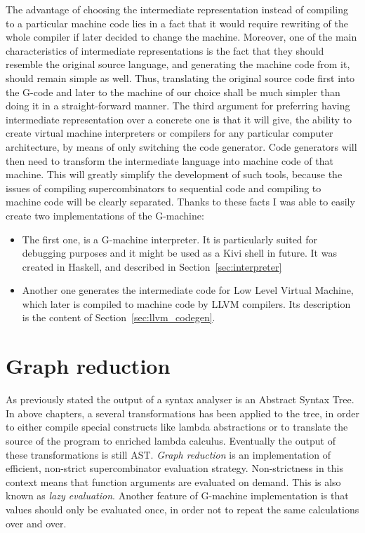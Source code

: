 \documentclass[12pt,a4paper]{report}
\begin{document}
The advantage of choosing the intermediate representation instead of compiling
to a particular machine code lies in a fact that it would require rewriting of
the whole compiler if later decided to change the machine. Moreover, one of the
main characteristics of intermediate representations is the fact that they
should resemble the original source language, and generating the machine code
from it, should remain simple as well. Thus, translating the original source
code first into the G-code and later to the machine of our choice shall be much
simpler than doing it in a straight-forward manner. The third argument for
preferring having intermediate representation over a concrete one is that it
will give, the ability to create virtual machine interpreters or compilers
for any particular computer architecture, by means of only switching
the code generator. Code generators will then need to transform the
intermediate language into machine code of that machine. This will greatly
simplify the development of such tools, because the issues of compiling
supercombinators to sequential code and compiling to machine code will be
clearly separated.  Thanks to these facts I was able to easily create two
implementations of the G-machine:

\begin{itemize}
  \item The first one, is a G-machine interpreter. It is particularly suited
    for debugging purposes and it might be used as a Kivi shell in future. It
    was created in Haskell, and described in Section~\ref{sec:interpreter}
  \item Another one generates the intermediate code for Low Level Virtual
    Machine, which later is compiled to machine code by LLVM compilers. Its
    description is the content of Section~\ref{sec:llvm_codegen}.
\end{itemize}

\section{Graph reduction}
\label{sec:graph_reduction}
As previously stated the output of a syntax analyser is an Abstract Syntax
Tree. In above chapters, a several transformations has been applied to the
tree, in order to either compile special constructs like lambda abstractions or
to translate the source of the program to enriched lambda calculus. Eventually
the output of these transformations is still AST. \textit{Graph reduction} is
an implementation of efficient, non-strict supercombinator evaluation strategy.
Non-strictness in this context means that function arguments are evaluated on
demand. This is also known as \textit{lazy evaluation}. Another feature of
G-machine implementation is that values should only be evaluated once, in order
not to repeat the same calculations over and over.
\end{document}
